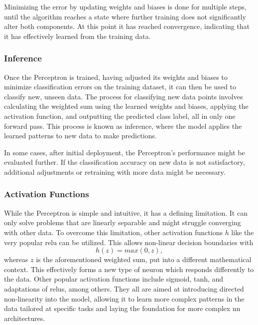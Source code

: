 Minimizing the error by updating weights and biases is done for multiple steps, until the algorithm reaches a state where further training does not significantly alter both components. At this point it has reached convergence, indicating that it has effectively learned from the training data.

\subsubsection*{Inference}

Once the Perceptron is trained, having adjusted its weights and biases to minimize classification errors on the training dataset, it can then be used to classify new, unseen data. The process for classifying new data points involves calculating the weighted sum using the learned weights and biases, applying the activation function, and outputting the predicted class label, all in only one forward pass. This process is known as inference, where the model applies the learned patterns to new data to make predictions.

In some cases, after initial deployment, the Perceptron's performance might be evaluated further. If the classification accuracy on new data is not satisfactory, additional adjustments or retraining with more data might be necessary.

\subsubsection*{Activation Functions}
\label{subsec:activation}

While the Perceptron is simple and intuitive, it has a defining limitation. It can only solve problems that are linearly separable and might struggle converging with other data. To overcome this limitation, other activation functions \( h \) like the very popular \gls{relu} \autocite{Szeliski2022} can be utilized. This allows non-linear decision boundaries with
\begin{equation}
    h(z) = max(0, z),
\end{equation}
whereas \( z \) is the aforementioned weighted sum, put into a different mathematical context. This effectively forms a new type of neuron which responds differently to the data. Other popular activation functions include sigmoid, tanh, and adaptations of \glspl{relu}, among others. They all are aimed at introducing directed non-linearity into the model, allowing it to learn more complex patterns in the data tailored at specific tasks and laying the foundation for more complex \gls{nn} architectures.

